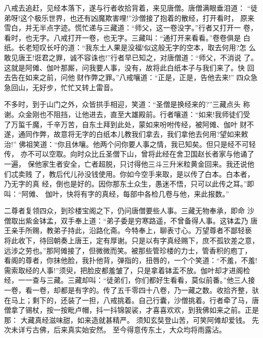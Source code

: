 八戒去追赶，见经本落下，遂与行者收拾背着，来见唐僧。唐僧满眼垂泪道：
“徒弟呀!这个极乐世界，也还有凶魔欺害哩!”沙僧接了抱着的散经，打开看时，
原来雪白，并无半点字迹。慌忙递与三藏道：“师父，这一卷没字。”行者又打开一
卷，看时，也无字。八戒打开一卷，也无字。三藏叫：“通打开来看看。”卷卷俱是
白纸。长老短叹长吁的道：“我东土人果是没福!似这般无字的空本，取去何用?怎
么敢见唐王!诳君之罪，诚不容诛也!”行者早已知之，对唐僧道：“师父，不消说
了。这就是阿傩、伽叶那厮，问我要人事，没有，故将此白纸本子与我们来了。快
回去告在如来之前，问他财作弊之罪。”八戒嚷道：“正是，正是，告他去来!”
四众急急回山，无好步，忙忙又转上雷音。

不多时，到于山门之外，众皆拱手相迎，笑道：“圣僧是换经来的?”三藏点头
称谢。众金刚也不阻挡，让他进去，直至大雄殿前。行者嚷道：“如来!我师徒们受
了万蜇千魔，千辛万苦，自东土拜到此处，蒙如来吩咐传经，被阿傩、伽叶财不
遂，通同作弊，故意将无字的白纸本儿教我们拿去，我们拿他去何用?望如来敕治!”
佛祖笑道：“你且休嚷。他两个问你要人事之情，我已知矣。但只是经不可轻传，
亦不可以空取。向时众比丘圣僧下山，曾将此经在舍卫国赵长者家与他诵了一遍，
保他家生者安全，亡者超脱，只讨得他三斗三升米粒黄金回来。我还说他们忒卖贱
了，教后代儿孙没钱使用。你如今空手来取，是以传了白本。白本者，乃无字的真
经，倒也是好的。因你那东土众生，愚迷不悟，只可以此传之耳。”即叫：“阿傩、
伽叶，快将有字的真经，每部中各检几卷与他，来此报数。”

二尊者复领四众，到珍楼宝阁之下，仍问唐僧要些人事。三藏无物奉承，即命
沙僧取出紫金钵孟，双手奉上道：“弟子委是穷寒路遥，不曾备得人事。这钵盂乃
唐王亲手所赐，教弟子持此，沿路化斋。今特奉上，聊表寸心。万望尊者不鄙轻亵
将此收下，待回朝奏上唐王，定有厚谢。只是以有字真经赐下，庶不孤钦差之意，
远涉之劳也。”那阿傩接了，但微微而笑。被那些管珍楼的力士，管香积的庖丁，
看阁的尊者，你抹他脸，我扑他背，弹指的，扭唇的，一个个笑道：“不羞，不羞!
需索取经的人事!”须臾，把脸皮都羞皱了，只是拿着钵盂不放。伽叶却才进阁检
经，一一查与三藏。三藏却叫：“徒弟们，你们都好生看看，莫似前番。”他三人接
一卷，看一卷，却都是有字的。传了五千零四十八卷，乃一藏之数。收拾齐整，驮
在马上；剩下的，还装了一担，八戒挑着。自己行囊，沙僧挑着。行者牵了马，唐
僧拿了锡杖，按一按毗卢帽，抖一抖锦袈裟，才喜喜欢欢，到我佛如来之前。正是
那：
大藏真经滋味甜，如来造就甚精严。
须知玄奘登山苦，可笑阿傩却爱钱。
先次未详亏古佛，后来真实始安然。
至今得意传东土，大众均将雨露沾。

